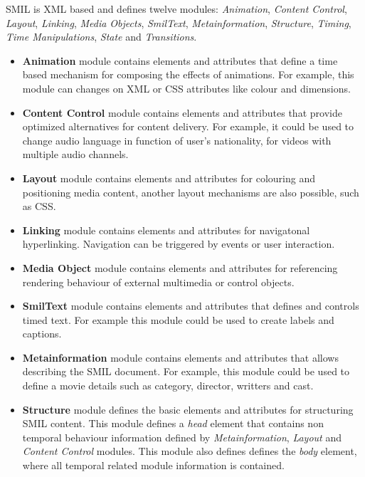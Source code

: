   \ac{SMIL} is \ac{XML} based and defines twelve modules: \textit{Animation}, \textit{Content Control}, \textit{Layout}, \textit{Linking}, \textit{Media Objects}, \textit{SmilText}, \textit{Metainformation}, \textit{Structure}, \textit{Timing}, \textit{Time Manipulations}, \textit{State} and \textit{Transitions}.

\begin{itemize}

  \item \textbf{Animation} module contains elements and attributes that define a time based mechanism for composing the effects of animations. For example, this module can changes on \ac{XML} or \ac{CSS} attributes like colour and dimensions.  

  \item \textbf{Content Control} module contains elements and attributes that provide optimized alternatives for content delivery. For example, it could be used to change audio language in function of user's nationality, for videos with multiple audio channels.

  \item \textbf{Layout} module contains elements and attributes for colouring and positioning media content, another layout mechanisms are also possible, such as \ac{CSS}.

  \item \textbf{Linking} module contains elements and attributes for navigatonal hyperlinking. Navigation can be triggered by events or user interaction.

  \item \textbf{Media Object} module contains elements and attributes for referencing rendering behaviour of external multimedia or control objects.

  \item \textbf{SmilText} module contains elements and attributes that defines and controls timed text. For example this module could be used to create labels and captions.

  \item \textbf{Metainformation} module contains elements and attributes that allows describing the \ac{SMIL} document. For example, this module could be used to define a movie details such as category, director, writters and cast.

  \item \textbf{Structure} module defines the basic elements and attributes for structuring \ac{SMIL} content. This module defines a \textit{head} element that contains non temporal behaviour information defined by  \textit{Metainformation}, \textit{Layout} and \textit{Content Control} modules. This module also defines defines the \textit{body} element, where all temporal related module information is contained.


\end{itemize}
